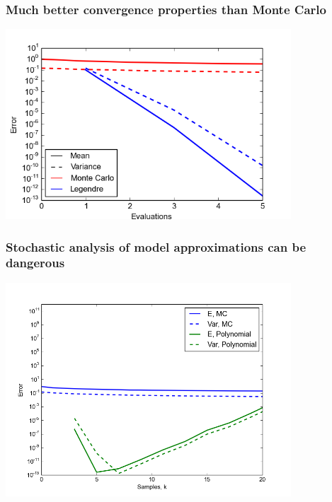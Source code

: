 \documentclass{beamer}
\begin{document}
\begin{frame}
  \frametitle{Much better convergence properties than Monte Carlo}
  \begin{center}
    \includegraphics[width=0.8\textwidth]{MC_convergence_1D_2_short.png}
  \end{center}
\end{frame}

\begin{frame}
  \frametitle{Stochastic analysis of model approximations can be
  dangerous}
  \begin{center}
    \includegraphics[width=0.8\textwidth]{MC_convergence_1D_2.png}
  \end{center}
\end{frame}
\end{document}
